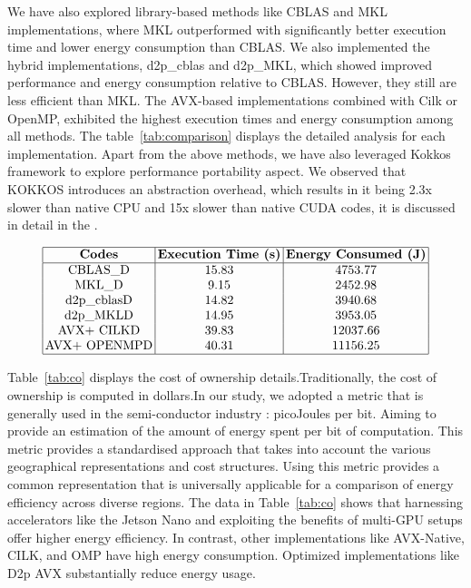 We have also explored library-based methods like CBLAS and MKL implementations, where MKL outperformed with significantly better execution time and lower energy consumption than CBLAS.  We also implemented the hybrid implementations, d2p\_cblas and d2p\_MKL, which showed improved performance and energy consumption relative to CBLAS. However, they still are less efficient than MKL. The AVX-based implementations combined with Cilk or OpenMP, exhibited the highest execution times and energy consumption among all methods.  The table~\ref{tab:comparison} displays the detailed analysis for each implementation. Apart from the above methods, we have also leveraged Kokkos framework to explore performance portability aspect. We observed that KOKKOS introduces an abstraction overhead, which results in it being 2.3x slower than native CPU and 15x slower than native CUDA codes, it is discussed in detail in the \cite{kokkos}.

\begin{table}[htbp]
    $$
    \setlength{\tabcolsep}{2pt}
    \begin{tabular}{|c|c|c|}
        \hline
        \textbf{Codes} & \textbf{Execution Time (s)} & \textbf{Energy Consumed (J)} \\
        \hline
        CBLAS\_D      & 15.83   & 4753.77  \\
        MKL\_D        & 9.15    & 2452.98  \\
        d2p\_cblasD   & 14.82   & 3940.68  \\
        d2p\_MKLD     & 14.95   & 3953.05  \\
        AVX+ CILKD    & 39.83   & 12037.66 \\
        AVX+ OPENMPD  & 40.31   & 11156.25 \\
        \hline
    \end{tabular}
    $$
    \caption{Comparison of execution time and energy consumption across different implementations for 16k-sized matrices.}
    \label{tab:comparison}
\end{table}


Table~\ref{tab:co} displays the cost of ownership details.Traditionally, the cost of ownership is computed in dollars.In our study, we adopted a metric that is generally used in the semi-conductor industry : picoJoules per bit. Aiming to provide an estimation of the amount of energy spent per bit of computation. This metric provides a standardised approach that takes into account the various geographical representations and cost structures. Using this metric provides a common representation that is universally applicable for a comparison of energy efficiency across diverse regions. 
The data in Table~\ref{tab:co} shows that harnessing accelerators like the Jetson Nano and exploiting the benefits of multi-GPU setups offer higher energy efficiency. In contrast, other implementations like AVX-Native, CILK, and OMP have high energy consumption. Optimized implementations like D2p AVX substantially reduce energy usage.


